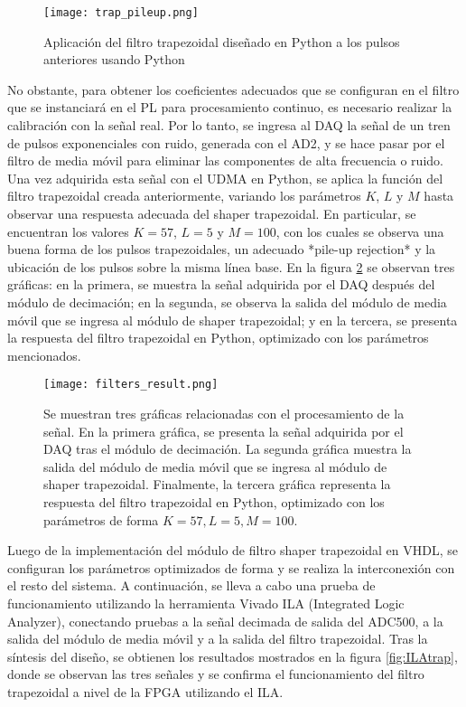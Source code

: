 \documentclass{report}
\begin{document}
\begin{figure}[H]
    \centering
    \texttt{[image: trap\_pileup.png]}
    \caption{Aplicación del filtro trapezoidal diseñado en Python a los pulsos anteriores usando Python}
    \label{fig:trap_pileup}
\end{figure}

\noindent No obstante, para obtener los coeficientes adecuados que se configuran en el filtro que se instanciará en el PL para procesamiento continuo, es necesario realizar la calibración con la señal real. Por lo tanto, se ingresa al DAQ la señal de un tren de pulsos exponenciales con ruido, generada con el AD2, y se hace pasar por el filtro de media móvil para eliminar las componentes de alta frecuencia o ruido. Una vez adquirida esta señal con el UDMA en Python, se aplica la función del filtro trapezoidal creada anteriormente, variando los parámetros \( K \), \( L \) y \( M \) hasta observar una respuesta adecuada del shaper trapezoidal. En particular, se encuentran los valores \( K = 57 \), \( L = 5 \) y \( M = 100 \), con los cuales se observa una buena forma de los pulsos trapezoidales, un adecuado *pile-up rejection* y la ubicación de los pulsos sobre la misma línea base. En la figura \ref{fig:trap_design_python} se observan tres gráficas: en la primera, se muestra la señal adquirida por el DAQ después del módulo de decimación; en la segunda, se observa la salida del módulo de media móvil que se ingresa al módulo de shaper trapezoidal; y en la tercera, se presenta la respuesta del filtro trapezoidal en Python, optimizado con los parámetros mencionados.

\begin{figure}[H]
    \centering
    \texttt{[image: filters\_result.png]}
    \caption{Se muestran tres gráficas relacionadas con el procesamiento de la señal. En la primera gráfica, se presenta la señal adquirida por el DAQ tras el módulo de decimación. La segunda gráfica muestra la salida del módulo de media móvil que se ingresa al módulo de shaper trapezoidal. Finalmente, la tercera gráfica representa la respuesta del filtro trapezoidal en Python, optimizado con los parámetros de forma $K=57, L=5, M=100$.}
    \label{fig:trap_design_python}
\end{figure}

\noindent Luego de la implementación del módulo de filtro shaper trapezoidal en VHDL, se configuran los parámetros optimizados de forma y se realiza la interconexión con el resto del sistema. A continuación, se lleva a cabo una prueba de funcionamiento utilizando la herramienta Vivado ILA (Integrated Logic Analyzer), conectando pruebas a la señal decimada de salida del ADC500, a la salida del módulo de media móvil y a la salida del filtro trapezoidal. Tras la síntesis del diseño, se obtienen los resultados mostrados en la figura \ref{fig:ILAtrap}, donde se observan las tres señales y se confirma el funcionamiento del filtro trapezoidal a nivel de la FPGA utilizando el ILA.\\
\end{document}
